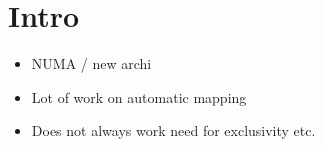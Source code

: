 \section{Intro}
\label{sec:intro}

\begin{itemize}
    \item NUMA / new archi
    \item Lot of work on automatic mapping
    \item Does not always work need for exclusivity etc.
\end{itemize}

